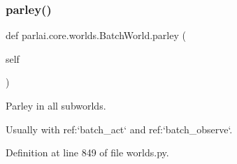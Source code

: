 \subsubsection{\texorpdfstring{parley()}{parley()}}
{\footnotesize\ttfamily def parlai.\+core.\+worlds.\+Batch\+World.\+parley (\begin{DoxyParamCaption}\item[{}]{self }\end{DoxyParamCaption})}

\begin{DoxyVerb}Parley in all subworlds.

Usually with ref:`batch_act` and ref:`batch_observe`.
\end{DoxyVerb}
 

Definition at line 849 of file worlds.\+py.


